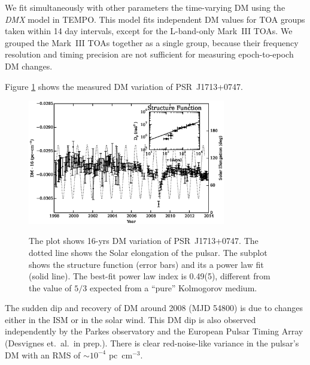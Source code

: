 We fit simultaneously with other parameters the time-varying DM using the {\it
DMX} model in {\sc TEMPO}.
This model fits independent DM values for TOA groups taken within 14 day
intervals, except for the L-band-only Mark~III TOAs. We grouped the Mark~III
TOAs together as a single group, because their frequency resolution and timing
precision are not sufficient for measuring epoch-to-epoch DM changes.

Figure \ref{fig:dmx} shows the measured DM variation of PSR~J1713+0747.
%
\begin{figure}
\includegraphics[width=3.4in]{DMX.ps} \\ 
\caption {\label{fig:dmx} The plot shows 16-yrs DM variation of PSR~J1713+0747. The dotted line shows the Solar
elongation of the pulsar. The subplot shows the structure
function (error bars) and its a power law fit (solid line). The best-fit power law index is
0.49(5), different from the value of $5/3$ expected from a ``pure'' Kolmogorov medium. } 
\end{figure} 
The sudden dip and recovery of DM around 2008 (MJD 54800) is 
due to changes either in the ISM or in the solar wind. This DM dip is also
observed independently by the Parkes observatory \citep{kcs+13} and the
European Pulsar Timing Array (Desvignes et.~al.\ in prep.).
There is clear red-noise-like variance in the pulsar's DM with an RMS of
$\sim10^{-4}$ pc~cm$^{-3}$. 



